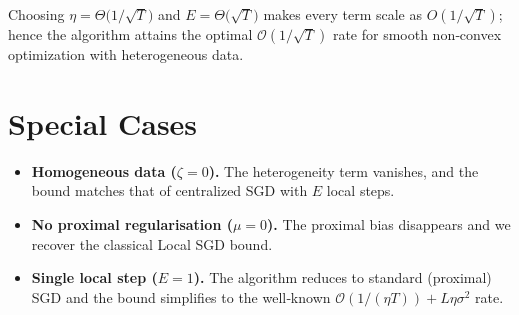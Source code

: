 \documentclass{article}
\begin{document}
Choosing $\eta = \Theta\!\bigl(1/\sqrt{T}\bigr)$ and $E = \Theta\!\bigl(\sqrt{T}\bigr)$ makes every term scale as $O(1/\sqrt{T})$; hence the algorithm attains the optimal $\mathcal{O}(1/\sqrt{T})$ rate for smooth non‑convex optimization with heterogeneous data.

\section*{Special Cases}
\begin{itemize}
\item \textbf{Homogeneous data ($\zeta=0$).} The heterogeneity term vanishes, and the bound matches that of centralized SGD with $E$ local steps.
\item \textbf{No proximal regularisation ($\mu=0$).} The proximal bias disappears and we recover the classical Local SGD bound.
\item \textbf{Single local step ($E=1$).} The algorithm reduces to standard (proximal) SGD and the bound simplifies to the well‑known $\mathcal{O}(1/(\eta T)) + L\eta\sigma^{2}$ rate.
\end{itemize}
\end{document}
